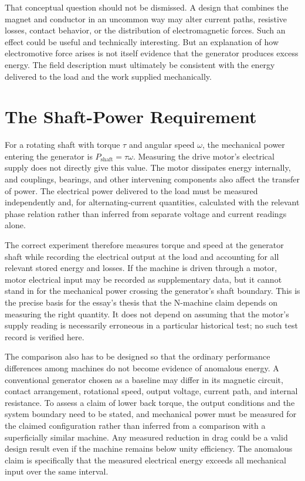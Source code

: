 \documentclass[11pt]{article}
\begin{document}
That conceptual question should not be dismissed. A design that combines the magnet and conductor in an uncommon way may alter current paths, resistive losses, contact behavior, or the distribution of electromagnetic forces. Such an effect could be useful and technically interesting. But an explanation of how electromotive force arises is not itself evidence that the generator produces excess energy. The field description must ultimately be consistent with the energy delivered to the load and the work supplied mechanically.

\section{The Shaft-Power Requirement}

For a rotating shaft with torque $\tau$ and angular speed $\omega$, the mechanical power entering the generator is $P_{\mathrm{shaft}}=\tau\omega$. Measuring the drive motor's electrical supply does not directly give this value. The motor dissipates energy internally, and couplings, bearings, and other intervening components also affect the transfer of power. The electrical power delivered to the load must be measured independently and, for alternating-current quantities, calculated with the relevant phase relation rather than inferred from separate voltage and current readings alone.

The correct experiment therefore measures torque and speed at the generator shaft while recording the electrical output at the load and accounting for all relevant stored energy and losses. If the machine is driven through a motor, motor electrical input may be recorded as supplementary data, but it cannot stand in for the mechanical power crossing the generator's shaft boundary. This is the precise basis for the essay's thesis that the N-machine claim depends on measuring the right quantity. It does not depend on assuming that the motor's supply reading is necessarily erroneous in a particular historical test; no such test record is verified here.

The comparison also has to be designed so that the ordinary performance differences among machines do not become evidence of anomalous energy. A conventional generator chosen as a baseline may differ in its magnetic circuit, contact arrangement, rotational speed, output voltage, current path, and internal resistance. To assess a claim of lower back torque, the output conditions and the system boundary need to be stated, and mechanical power must be measured for the claimed configuration rather than inferred from a comparison with a superficially similar machine. Any measured reduction in drag could be a valid design result even if the machine remains below unity efficiency. The anomalous claim is specifically that the measured electrical energy exceeds all mechanical input over the same interval.
\end{document}
